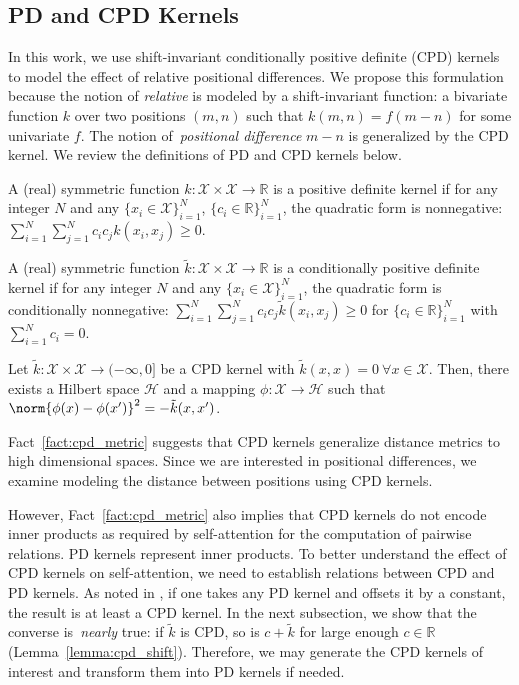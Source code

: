 \subsection{PD and CPD Kernels}
In this work, we use shift-invariant conditionally positive definite (CPD) kernels to model the effect of relative positional differences. We propose this formulation because the notion of \emph{relative} is modeled by a shift-invariant function: a bivariate function $k$ over two positions $(m,n)$ such that $k(m,n)=f(m-n)$ for some univariate $f$. The notion of~\emph{positional difference} $m-n$ is generalized by the CPD kernel. We review the definitions of PD and CPD kernels below.

\begin{definition}[PD Kernel]
A (real) symmetric function $k:\mathcal{X}\times\mathcal{X}\rightarrow\mathbb{R}$ is a positive definite kernel if for any integer $N$ and any $\{x_i\in\mathcal{X}\}_{i=1}^N$,  $\{c_i\in\mathbb{R}\}_{i=1}^N$, the quadratic form is nonnegative: $\sum_{i=1}^N\sum_{j=1}^Nc_ic_jk(x_i,x_j)\geq 0$.
\label{def:kernel}
\end{definition}

\begin{definition}
A (real) symmetric function $\tilde{k}:\mathcal{X}\times\mathcal{X}\rightarrow\mathbb{R}$ is a conditionally positive definite kernel if for any integer $N$ and any $\{x_i\in\mathcal{X}\}_{i=1}^N$, the quadratic form is conditionally nonnegative: $\sum_{i=1}^N\sum_{j=1}^Nc_ic_j\tilde{k}(x_i,x_j)\geq 0$ for $\{c_i\in\mathbb{R}\}_{i=1}^N$ with $\sum_{i=1}^N c_i=0.$
\label{def:cpd_kernel}
\end{definition}

\begin{fact}
    Let $\tilde{k}:\mathcal{X}\times\mathcal{X}\rightarrow (-\infty,0]$ be a CPD kernel with $\tilde{k}(x,x)=0~\forall x\in \mathcal{X}$. Then, there exists a Hilbert space $\mathcal{H}$ and a mapping $\phi:\mathcal{X}\rightarrow \mathcal{H}$ such that $\norm{\phi(x)-\phi(x')}^2=-\tilde{k}(x,x')$.
    \label{fact:cpd_metric}
\end{fact}
Fact~\ref{fact:cpd_metric} suggests that CPD kernels generalize distance metrics to high dimensional spaces. Since we are interested in positional differences, we examine modeling the distance between positions using CPD kernels.

However, Fact~\ref{fact:cpd_metric} also implies that CPD kernels do not encode inner products as required by self-attention for the computation of pairwise relations. PD kernels represent inner products. To better understand the effect of CPD kernels on self-attention, we need to establish relations between CPD and PD kernels. As noted in \citet{Schplkopf2000cpd}, if one takes any PD kernel and offsets it by a constant, the result is at least a CPD kernel. In the next subsection, we show that the converse is~\emph{nearly} true: if $\tilde{k}$ is CPD, so is $c+\tilde{k}$ for large enough $c\in\mathbb{R}$ (Lemma~\ref{lemma:cpd_shift}). Therefore, we may generate the CPD kernels of interest and transform them into PD kernels if needed.


